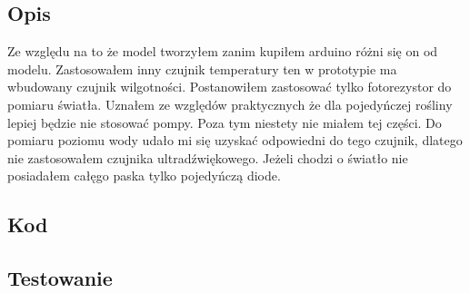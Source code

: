 \documentclass[a4paper,11pt]{uzreport}
\begin{document}
\subsection{Opis}
Ze względu na to że model tworzyłem zanim kupiłem arduino różni się on od modelu. Zastosowałem inny czujnik temperatury ten w prototypie ma wbudowany czujnik wilgotności. Postanowiłem zastosować tylko fotorezystor do pomiaru światła. Uznałem ze względów praktycznych że dla pojedyńczej rośliny lepiej będzie nie stosować pompy. Poza tym niestety nie miałem tej części. Do pomiaru poziomu wody udało mi się uzyskać odpowiedni do tego czujnik, dlatego nie zastosowałem czujnika ultradźwiękowego. Jeżeli chodzi o światło nie posiadałem całęgo paska tylko pojedyńczą diode.
\subsection{Kod}
\begin{center}
\end{center}
\subsection{Testowanie}
\end{document}
